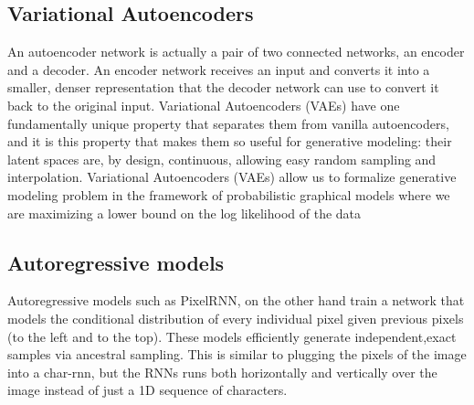   \subsection{Variational Autoencoders } 
  \label{sub:vae}
  An autoencoder network is actually a pair of two connected networks, an encoder and a decoder. An encoder network receives an input and converts it into a smaller, denser representation that the decoder network can use to convert it back to the original input. Variational Autoencoders (VAEs) have one fundamentally unique property that separates them from vanilla autoencoders, and it is this property that makes them so useful for generative modeling: their latent spaces are, by design, continuous, allowing easy random sampling and interpolation. Variational Autoencoders (VAEs) allow us to formalize generative modeling problem in the framework of probabilistic graphical models where we are maximizing a lower bound on the log likelihood of the data
  \subsection{Autoregressive models} 
  \label{sub:autoregressive} 
  Autoregressive models such as PixelRNN, on the other hand train a network that models the conditional distribution of every individual pixel given previous pixels (to the left and to the top). These models efficiently generate independent,exact samples via ancestral sampling. This is similar to plugging the pixels of the image into a char-rnn, but the RNNs runs both horizontally and vertically over the image instead of just a 1D sequence of characters.\par\bigskip

